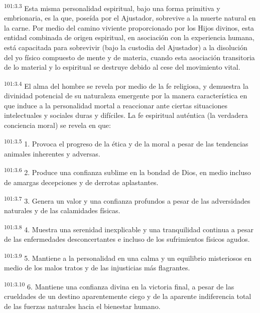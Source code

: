 \par
\textsuperscript{101:3.3} Esta misma personalidad espiritual, bajo una forma primitiva y embrionaria, es la que, poseída por el Ajustador, sobrevive a la muerte natural en la carne. Por medio del camino viviente proporcionado por los Hijos divinos, esta entidad combinada de origen espiritual, en asociación con la experiencia humana, está capacitada para sobrevivir (bajo la custodia del Ajustador) a la disolución del yo físico compuesto de mente y de materia, cuando esta asociación transitoria de lo material y lo espiritual se destruye debido al cese del movimiento vital.

\par
\textsuperscript{101:3.4} El alma del hombre se revela por medio de la fe religiosa, y demuestra la divinidad potencial de su naturaleza emergente por la manera característica en que induce a la personalidad mortal a reaccionar ante ciertas situaciones intelectuales y sociales duras y difíciles. La fe espiritual auténtica (la verdadera conciencia moral) se revela en que:

\par
\textsuperscript{101:3.5} 1. Provoca el progreso de la ética y de la moral a pesar de las tendencias animales inherentes y adversas.

\par
\textsuperscript{101:3.6} 2. Produce una confianza sublime en la bondad de Dios, en medio incluso de amargas decepciones y de derrotas aplastantes.

\par
\textsuperscript{101:3.7} 3. Genera un valor y una confianza profundos a pesar de las adversidades naturales y de las calamidades físicas.

\par
\textsuperscript{101:3.8} 4. Muestra una serenidad inexplicable y una tranquilidad continua a pesar de las enfermedades desconcertantes e incluso de los sufrimientos físicos agudos.

\par
\textsuperscript{101:3.9} 5. Mantiene a la personalidad en una calma y un equilibrio misteriosos en medio de los malos tratos y de las injusticias más flagrantes.

\par
\textsuperscript{101:3.10} 6. Mantiene una confianza divina en la victoria final, a pesar de las crueldades de un destino aparentemente ciego y de la aparente indiferencia total de las fuerzas naturales hacia el bienestar humano.

